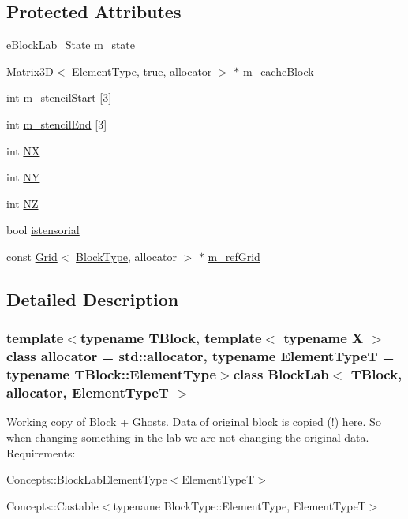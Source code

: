 \subsection*{Protected Attributes}
\begin{DoxyCompactItemize}
\item 
\hyperlink{class_block_lab_ad3a1e6e1a1002fb812d6853c8ac1ec9e}{e\+Block\+Lab\+\_\+\+State} \hyperlink{class_block_lab_a0e11603d73ab4923e1d9033edccdb572}{m\+\_\+state}
\item 
\hyperlink{class_matrix3_d}{Matrix3\+D}$<$ \hyperlink{class_block_lab_accdcd2d5e815a8497e5ef9ae884da6b6}{Element\+Type}, true, allocator $>$ $\ast$ \hyperlink{class_block_lab_aa6a4c4e00a9bb5ca5780d820b146485b}{m\+\_\+cache\+Block}
\item 
int \hyperlink{class_block_lab_a8ac6690f98ba84346a74b5b95c3afb2b}{m\+\_\+stencil\+Start} \mbox{[}3\mbox{]}
\item 
int \hyperlink{class_block_lab_a46fee08b49b11be489c71f726e258cc9}{m\+\_\+stencil\+End} \mbox{[}3\mbox{]}
\item 
int \hyperlink{class_block_lab_abcd7367c6f45124d3202c8da5043ac93}{N\+X}
\item 
int \hyperlink{class_block_lab_aaa1e748664ebb6b4fc7c47cf30a445db}{N\+Y}
\item 
int \hyperlink{class_block_lab_acdd7f4e2489d31da6a2a76099807a7c5}{N\+Z}
\item 
bool \hyperlink{class_block_lab_ade306bb6935a0ead765444534c2e05db}{istensorial}
\item 
const \hyperlink{class_grid}{Grid}$<$ \hyperlink{class_block_lab_a745b3c9ac17f6743d11a7085196981a0}{Block\+Type}, allocator $>$ $\ast$ \hyperlink{class_block_lab_acccfe85f166f20526118fce09b28fb04}{m\+\_\+ref\+Grid}
\end{DoxyCompactItemize}


\subsection{Detailed Description}
\subsubsection*{template$<$typename T\+Block, template$<$ typename X $>$ class allocator = std\+::allocator, typename Element\+Type\+T = typename T\+Block\+::\+Element\+Type$>$class Block\+Lab$<$ T\+Block, allocator, Element\+Type\+T $>$}

Working copy of Block + Ghosts. Data of original block is copied (!) here. So when changing something in the lab we are not changing the original data. Requirements\+:
\begin{DoxyItemize}
\item Concepts\+::\+Block\+Lab\+Element\+Type$<$\+Element\+Type\+T$>$
\item Concepts\+::\+Castable$<$typename Block\+Type\+::\+Element\+Type, Element\+Type\+T$>$ 
\end{DoxyItemize}

